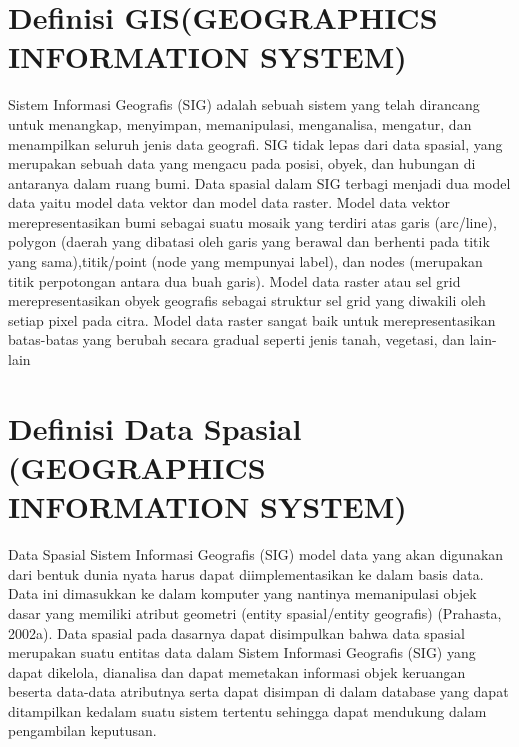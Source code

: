 \section{Definisi GIS(GEOGRAPHICS INFORMATION SYSTEM)}
Sistem Informasi Geografis (SIG) adalah sebuah sistem yang telah dirancang untuk menangkap, menyimpan, memanipulasi, menganalisa, mengatur, dan menampilkan seluruh jenis data geografi. SIG tidak lepas dari data spasial, yang merupakan sebuah data yang mengacu pada posisi, obyek, dan
hubungan di antaranya dalam ruang bumi. Data spasial dalam SIG terbagi menjadi dua model data
yaitu model data vektor dan model data raster. Model data vektor merepresentasikan bumi sebagai
suatu mosaik yang terdiri atas garis (arc/line), polygon (daerah yang dibatasi oleh garis yang
berawal dan berhenti pada titik yang sama),titik/point (node yang mempunyai label), dan nodes
(merupakan titik perpotongan antara dua buah garis).
Model data raster atau sel grid merepresentasikan obyek geografis sebagai struktur sel grid yang diwakili oleh setiap pixel pada citra. Model data raster sangat baik untuk merepresentasikan batas-batas yang berubah secara gradual seperti jenis tanah, vegetasi, dan lain-lain

\section{Definisi Data Spasial (GEOGRAPHICS INFORMATION SYSTEM)}
Data Spasial Sistem Informasi Geografis (SIG) model data yang akan digunakan dari bentuk dunia nyata harus dapat diimplementasikan ke dalam basis data. Data ini dimasukkan ke dalam komputer yang nantinya memanipulasi objek dasar yang memiliki atribut geometri (entity spasial/entity geografis) 
(Prahasta, 2002a). Data spasial pada dasarnya dapat disimpulkan bahwa data spasial merupakan suatu entitas data dalam Sistem Informasi Geografis (SIG) yang dapat dikelola, dianalisa dan dapat memetakan informasi objek keruangan beserta data-data atributnya serta dapat disimpan di dalam database yang dapat ditampilkan kedalam suatu sistem tertentu sehingga dapat mendukung dalam pengambilan keputusan. 

